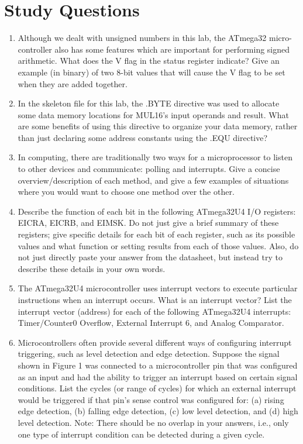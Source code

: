 \documentclass[12pt,letterpaper]{article}
\begin{document}
\section{Study Questions}
\begin{enumerate}
    \item
    Although we dealt with unsigned numbers in this lab, the ATmega32 micro-controller also has some features which are important for performing signed arithmetic. What does the V flag in the status register indicate? Give an example (in binary) of two 8-bit values that will cause the V flag to be set when they are added together.
    
    \item 
    In the skeleton file for this lab, the .BYTE directive was used to allocate some data memory locations for MUL16’s input operands and result. What are some benefits of using this directive to organize your data memory, rather than just declaring some address constants using the .EQU directive?
    \item 
    In computing, there are traditionally two ways for a microprocessor to listen to other devices and communicate: polling and interrupts. Give a concise overview/description of each method, and give a few examples of situations
    where you would want to choose one method over the other.    
    \item
	Describe the function of each bit in the following ATmega32U4 I/O registers: EICRA, EICRB, and EIMSK. Do not just give a brief summary of these registers; give specific details for each bit of each register, such as its possible values and what function or setting results from each of those values. Also, do not just directly paste your answer from the datasheet, but instead try	to describe these details in your own words.
    
	\item 
	The ATmega32U4 microcontroller uses interrupt vectors to execute particular instructions when an interrupt occurs. What is an interrupt vector? List the interrupt vector (address) for each of the following ATmega32U4 interrupts: Timer/Counter0 Overflow, External Interrupt 6, and Analog Comparator.
	
	
	
	
	\item 
	Microcontrollers often provide several different ways of configuring interrupt triggering, such as level detection and edge detection. Suppose the signal shown in Figure 1 was connected to a microcontroller pin that was configured
	as an input and had the ability to trigger an interrupt based on certain signal conditions. List the cycles (or range of cycles) for which an external interrupt would be triggered if that pin’s sense control was configured for: (a) rising
	edge detection, (b) falling edge detection, (c) low level detection, and (d) high level detection. Note: There should be no overlap in your answers, i.e., only one type of interrupt condition can be detected during a given cycle.
	
	

\end{enumerate}
\end{document}
